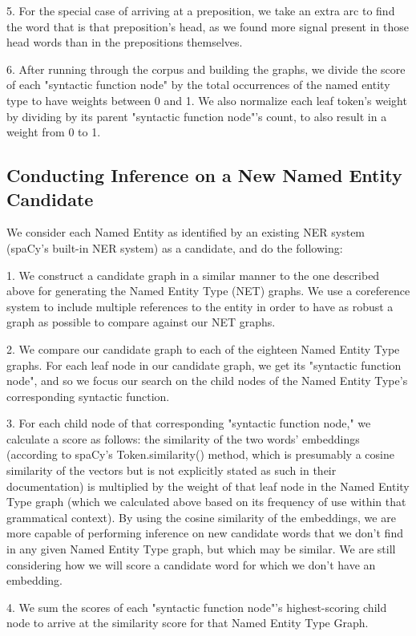 \documentclass[11pt,a4paper]{article}
\begin{document}
5. For the special case of arriving at a preposition, we take an extra arc to find the word that is that preposition's head, as we found more signal present in those head words than in the prepositions themselves.

6. After running through the corpus and building the graphs, we divide the score of each "syntactic function node" by the total occurrences of the named entity type to have weights between 0 and 1. We also normalize each leaf token's weight by dividing by its parent "syntactic function node"'s count, to also result in a weight from 0 to 1.

\subsection{Conducting Inference on a New Named Entity Candidate}

We consider each Named Entity as identified by an existing NER system (spaCy's built-in NER system) as a candidate, and do the following:

1. We construct a candidate graph in a similar manner to the one described above for generating the Named Entity Type (NET) graphs. We use a coreference system to include multiple references to the entity in order to have as robust a graph as possible to compare against our NET graphs.

2. We compare our candidate graph to each of the eighteen Named Entity Type graphs. For each leaf node in our candidate graph, we get its "syntactic function node", and so we focus our search on the child nodes of the Named Entity Type's corresponding syntactic function.

3. For each child node of that corresponding "syntactic function node," we calculate a score as follows: the similarity of the two words' embeddings (according to spaCy's Token.similarity() method, which is presumably a cosine similarity of the vectors but is not explicitly stated as such in their documentation) is multiplied by the weight of that leaf node in the Named Entity Type graph (which we calculated above based on its frequency of use within that grammatical context). By using the cosine similarity of the embeddings, we are more capable of performing inference on new candidate words that we don't find in any given Named Entity Type graph, but which may be similar. We are still considering how we will score a candidate word for which we don't have an embedding.

4. We sum the scores of each "syntactic function node"'s highest-scoring child node to arrive at the similarity score for that Named Entity Type Graph.
\end{document}
